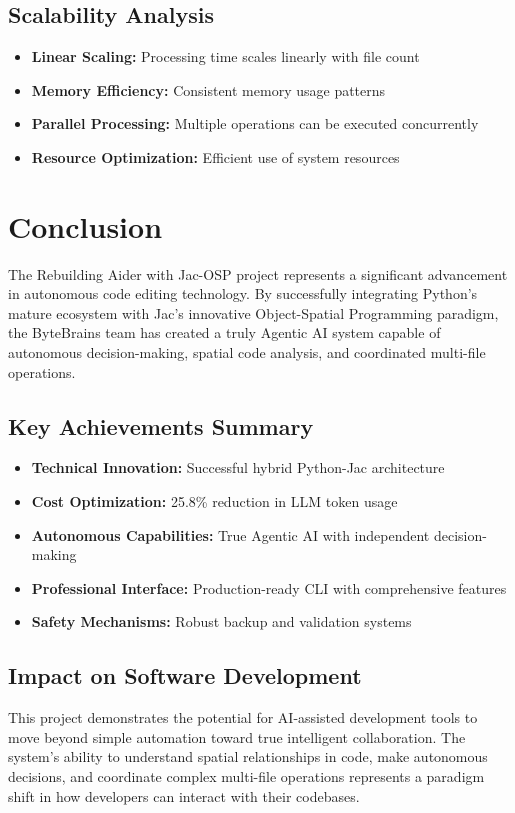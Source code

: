 \documentclass[12pt,a4paper]{article}
\begin{document}
\subsection{Scalability Analysis}

\begin{itemize}
    \item \textbf{Linear Scaling:} Processing time scales linearly with file count
    \item \textbf{Memory Efficiency:} Consistent memory usage patterns
    \item \textbf{Parallel Processing:} Multiple operations can be executed concurrently
    \item \textbf{Resource Optimization:} Efficient use of system resources
\end{itemize}

\section{Conclusion}

The Rebuilding Aider with Jac-OSP project represents a significant advancement in autonomous code editing technology. By successfully integrating Python's mature ecosystem with Jac's innovative Object-Spatial Programming paradigm, the ByteBrains team has created a truly Agentic AI system capable of autonomous decision-making, spatial code analysis, and coordinated multi-file operations.

\subsection{Key Achievements Summary}
\begin{itemize}
    \item \textbf{Technical Innovation:} Successful hybrid Python-Jac architecture
    \item \textbf{Cost Optimization:} 25.8\% reduction in LLM token usage
    \item \textbf{Autonomous Capabilities:} True Agentic AI with independent decision-making
    \item \textbf{Professional Interface:} Production-ready CLI with comprehensive features
    \item \textbf{Safety Mechanisms:} Robust backup and validation systems
\end{itemize}

\subsection{Impact on Software Development}
This project demonstrates the potential for AI-assisted development tools to move beyond simple automation toward true intelligent collaboration. The system's ability to understand spatial relationships in code, make autonomous decisions, and coordinate complex multi-file operations represents a paradigm shift in how developers can interact with their codebases.
\end{document}
